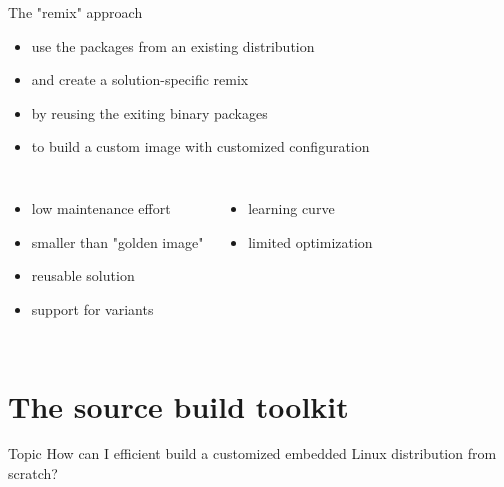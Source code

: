\documentclass{beamer}
\newcommand\pro{\item[$+$]}
\newcommand\con{\item[$-$]}
\begin{document}
\begin{frame}{The "remix" approach}
	\begin{itemize}
		\item use the packages from an existing distribution
		\item and create a solution-specific remix
		\item by reusing the exiting binary packages
		\item to build a custom image with customized configuration
	\end{itemize}

	\begin{columns}[t]
		\centering
		\begin{itemize}
			\pro low maintenance effort
			\pro smaller than "golden image"
			\pro reusable solution
			\pro support for variants
		\end{itemize}
		\centering
		\begin{itemize}
			\con learning curve
			\con limited optimization
		\end{itemize}
	\end{columns}
\end{frame}

\section{The source build toolkit}

\begin{frame}
	\begin{block}{Topic}
		How can I efficient build a customized embedded Linux distribution from scratch?
	\end{block}
\end{frame}
\end{document}
